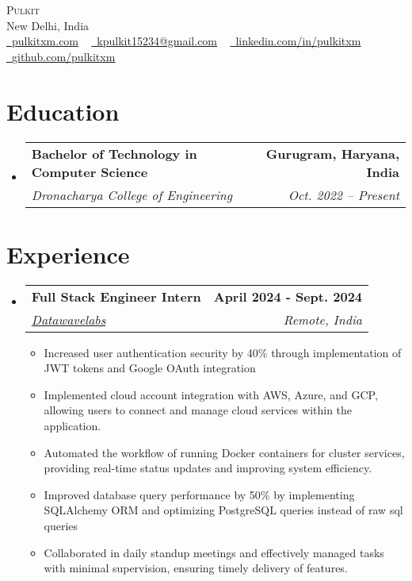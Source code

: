 \documentclass[letterpaper,11pt]{article}
\makeatletter
\newcommand{\resumeItem}[1]{
  \item{
    {#1 \vspace{-2pt}}
  }
}
\newcommand{\resumeSubheading}[4]{
  \vspace{-2pt}\item
    \begin{tabular*}{1.0\textwidth}[t]{l@{\extracolsep{\fill}}r}
      \textbf{#1} & \textbf{ #2} \\
      \textit{#3} & \textit{ #4} \\
    \end{tabular*}\vspace{-7pt}
}
\newcommand{\resumeSubHeadingListStart}{\begin{itemize}[leftmargin=0.0in, label={}]}
\newcommand{\resumeSubHeadingListEnd}{\end{itemize}}
\newcommand{\resumeItemListStart}{\begin{itemize}}
\newcommand{\resumeItemListEnd}{\end{itemize}\vspace{-5pt}}
\makeatother
\begin{document}
\begin{center}
    {\Huge \scshape Pulkit} \\ \vspace{3pt}
    New Delhi, India \\ \vspace{3pt}
    \small 
    \href{https://www.pulkitxm.com/}{\raisebox{-0.2\height}\faLink\ \underline{pulkitxm.com}} ~
    \href{mailto:kpulkit15234@gmail.com}{\raisebox{-0.2\height}\faEnvelope\ \underline{kpulkit15234@gmail.com}} ~
    \href{https://www.linkedin.com/in/pulkitxm}{\raisebox{-0.2\height}\faLinkedin\ \underline{linkedin.com/in/pulkitxm}} ~
    \href{https://github.com/Pulkitxm}{\raisebox{-0.2\height}\faGithub\ \underline{github.com/pulkitxm}}
    \vspace{-8pt}
\end{center}

\section{Education}
\resumeSubHeadingListStart%
\resumeSubheading%
{Bachelor of Technology in Computer Science}{Gurugram, Haryana, India}
{Dronacharya College of Engineering}{Oct. 2022 – Present}
\resumeSubHeadingListEnd%

\section{Experience}
\resumeSubHeadingListStart%
\resumeSubheading%
{Full Stack Engineer Intern}{April 2024 - Sept. 2024}
{\href{https://www.datawavelabs.io/}{Datawavelabs}}{Remote, India}
\resumeItemListStart%
\resumeItem{Increased user authentication security by 40\% through implementation of JWT tokens and Google OAuth integration}
\resumeItem{Implemented cloud account integration with AWS, Azure, and GCP, allowing users to connect and manage cloud services within the application.}
\resumeItem{Automated the workflow of running Docker containers for cluster services, providing real-time status updates and improving system efficiency.}
\resumeItem{Improved database query performance by 50\% by implementing SQLAlchemy ORM and optimizing PostgreSQL queries instead of raw sql queries}
\resumeItem{Collaborated in daily standup meetings and effectively managed tasks with minimal supervision, ensuring timely delivery of features.}
\resumeItemListEnd%
\resumeSubHeadingListEnd%
\vspace{-14pt}
\end{document}
